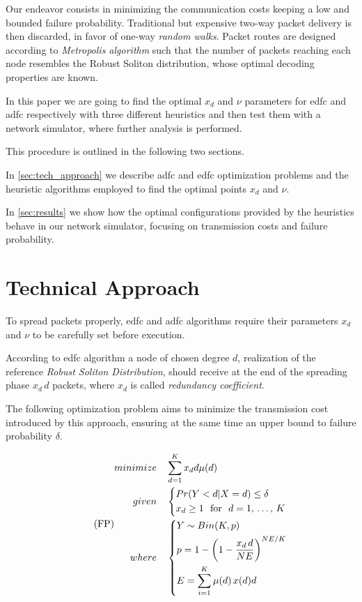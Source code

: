 \documentclass[12pt,journal,draftclsnofoot,onecolumn]{IEEEtran}
\begin{document}
Our endeavor consists in minimizing the communication costs keeping a low and bounded failure probability.
Traditional but expensive \mbox{two-way} packet delivery is then discarded, in favor of \mbox{one-way} \emph{random walks}.
Packet routes are designed according to \emph{Metropolis algorithm} such that the number of packets reaching each node resembles the Robust Soliton distribution, whose optimal decoding properties are known.\cite{Luby}

In this paper we are going to find the optimal $x_d$ and $\nu$ parameters for \gls{edfc} and \gls{adfc} respectively with three different heuristics and then test them with a network simulator, where further analysis is performed.

\smallbreak
This procedure is outlined in the following two sections.

In \autoref{sec:tech_approach} we describe \gls{adfc} and \gls{edfc} optimization problems and the heuristic algorithms employed to find the optimal points $x_d$ and $\nu$.

In \autoref{sec:results} we show how the optimal configurations provided by the heuristics behave in our network simulator, focusing on transmission costs and failure probability.

\section{Technical Approach}
\label{sec:tech_approach}
To spread packets properly, \gls{edfc} and \gls{adfc} algorithms require their parameters $x_d$ and $\nu$ to be carefully set before execution.

\smallbreak
According to \gls{edfc} algorithm a node of chosen degree $d$, realization of the reference \emph{Robust Soliton Distribution}, should receive at the end of the spreading phase $x_d \, d$ packets, where $x_d$ is called \emph{redundancy coefficient}.

The following optimization problem aims to minimize the transmission cost introduced by this approach, ensuring at the same time an upper bound to failure probability $\delta$.\cite{Lin2007}

\begin{equation}
	\label{eq:fp}
	\tag{FP}
	\begin{split}
		minimize \quad & \sum_{d=1}^K x_d d \mu (d) \\
		given \quad & \begin{dcases}
			Pr(Y<d|X=d) \leq \delta \\
			x_d \geq 1 \text{ ~for~ } d = 1, \, \ldots, \, K
		\end{dcases} \\
		where \quad & \begin{dcases}
			Y \sim Bin(K, p) \\
			p = 1 - \left( 1 - \frac{x_d \, d}{NE} \right) ^ {NE / K} \\
			E = \sum_{i = 1}^{K} \mu(d) \, x(d) d
		\end{dcases} \\
	\end{split}
\end{equation}
\end{document}
